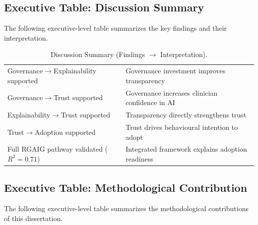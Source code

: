\subsection{Executive Table: Discussion Summary}
\label{sec:exec_discussion_summary}

\noindent The following executive-level table summarizes the key findings and their interpretation.

{\tablestripes\tablefontsize
{}
\begin{xltabular}{\textwidth}{@{} >{\raggedright\arraybackslash}p{6cm} L @{}}
\caption[Discussion Summary (Findings $\rightarrow$ Interpretation)]{Discussion Summary (Findings $\rightarrow$ Interpretation).}\label{tab:exec_discussion_summary} \\
\toprule
{} &  \\
\midrule
\endfirsthead
\endhead
\bottomrule
\endlastfoot
Governance$\rightarrow$Explainability supported & Governance investment improves transparency \\
\addlinespace
Governance$\rightarrow$Trust supported & Governance increases clinician confidence in AI \\
\addlinespace
Explainability$\rightarrow$Trust supported & Transparency directly strengthens trust \\
\addlinespace
Trust$\rightarrow$Adoption supported & Trust drives behavioural intention to adopt \\
\addlinespace
Full RGAIG pathway validated ($R^2=0.71$) & Integrated framework explains adoption readiness \\
\end{xltabular}}


\subsection{Executive Table: Methodological Contribution}
\label{sec:exec_methodological_contribution}

\noindent The following executive-level table summarizes the methodological contributions of this dissertation.

